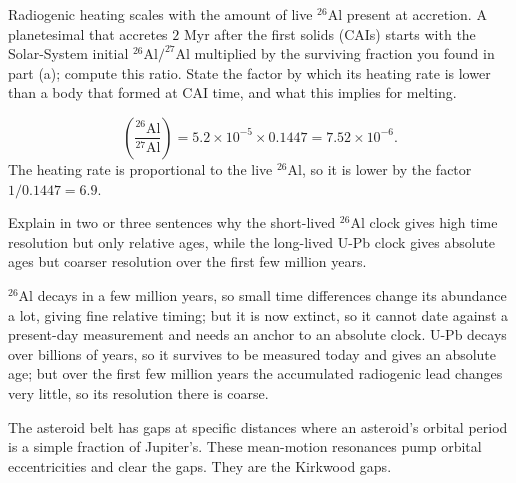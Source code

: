 \parti Radiogenic heating scales with the amount of live $^{26}$Al present at accretion. A planetesimal that accretes $2$ Myr after the first solids (CAIs) starts with the Solar-System initial $^{26}\mathrm{Al}/^{27}\mathrm{Al}$ multiplied by the surviving fraction you found in part (a); compute this ratio. State the factor by which its heating rate is lower than a body that formed at CAI time, and what this implies for melting.

\begin{solution}
\[
\left(\frac{^{26}\mathrm{Al}}{^{27}\mathrm{Al}}\right) = 5.2\times10^{-5} \times 0.1447 = 7.52\times10^{-6}.
\]
The heating rate is proportional to the live $^{26}$Al, so it is lower by the factor $1/0.1447 = 6.9$.
\end{solution}

\parti Explain in two or three sentences why the short-lived $^{26}$Al clock gives high time resolution but only relative ages, while the long-lived U-Pb clock gives absolute ages but coarser resolution over the first few million years.

\begin{solution}
$^{26}$Al decays in a few million years, so small time differences change its abundance a lot, giving fine relative timing; but it is now extinct, so it cannot date against a present-day measurement and needs an anchor to an absolute clock.
U-Pb decays over billions of years, so it survives to be measured today and gives an absolute age; but over the first few million years the accumulated radiogenic lead changes very little, so its resolution there is coarse.
\end{solution}



The asteroid belt has gaps at specific distances where an asteroid's orbital period is a simple fraction of Jupiter's.
These mean-motion resonances pump orbital eccentricities and clear the gaps.
They are the Kirkwood gaps.

